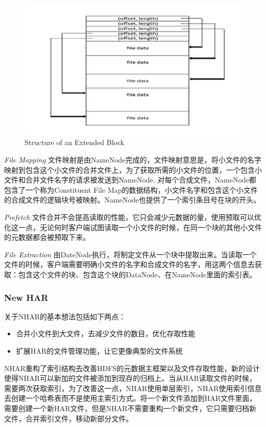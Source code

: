 \documentclass[UTF8]{ctexart}
\begin{document}
\begin{figure}[h]
\centering
\includegraphics{StructureofAnExtendedBlock.PNG}
\caption{Structure of an Extended Block}
\label{fig:StructureofAnExtendedBlock}
\end{figure}

\emph{File Mapping}
文件映射是由NameNode完成的，文件映射意思是，将小文件的名字映射到包含这个小文件的合并文件上，为了获取所需的小文件的位置，一个包含小文件和合并文件名字的请求被发送到NameNode. 对每个合成文件，NameNode都包含了一个称为Constituent File Map的数据结构，小文件名字和包含这个小文件的合成文件的逻辑块号被映射。NameNode也提供了一个索引条目号在块的开头。


\emph{Prefetch}
文件合并不会提高读取的性能，它只会减少元数据的量，使用预取可以优化这一点，无论何时客户端试图读取一个小文件的时候，在同一个块的其他小文件的元数据都会被预取下来。

\emph{File Extraction}
由DateNode执行，将制定文件从一个块中提取出来。当读取一个文件的时候，客户端需要明确小文件的名字和合成文件的名字，用这两个信息去获取：包含这个文件的块、包含这个块的DataNode、在NameNode里面的索引表。


\subsubsection{New HAR}
关于NHAR\cite{Nupairoj}的基本想法包括如下两点：

\begin{itemize}
\item 合并小文件到大文件，去减少文件的数目，优化存取性能
\item 扩展HAR的文件管理功能，让它更像典型的文件系统
\end{itemize}

NHAR重构了索引结构去改善HDFS的元数据主框架以及文件存取性能，新的设计使得NHAR可以新加的文件被添加到现存的归档上。当从HAR读取文件的时候，需要两次获取索引，为了改善这一点，NHAR使用单层索引，NHAR使用索引信息去创建一个哈希表而不是使用主索引方式。将一个新文件添加到HAR文件里面，需要创建一个新HAR文件，但是NHAR不需要重构一个新文件，它只需要归档新文件，合并索引文件，移动新部分文件。
\end{document}
